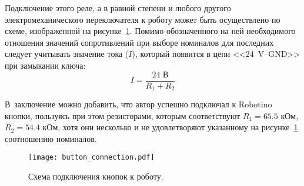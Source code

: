 Подключение этого реле, а в равной степени и любого другого электромеханического переключателя к роботу может быть осуществлено по схеме, изображенной на рисунке~\ref{img_button_connection}.
Помимо обозначенного на ней необходимого отношения значений сопротивлений при выборе номиналов для последних следует учитывать значение тока ($I$), который появится в цепи <<24~V--GND>> при замыкании ключа:
\begin{equation}
    I = \frac{24\text{ В}}{R_1 + R_2}
\end{equation}

В~заключение можно добавить, что автор успешно подключал к Robotino кнопки, пользуясь при этом резисторами, которым соответствуют $R_1 = 65.5\text{ кОм}$, $R_2 = 54.4\text{ кОм}$, хотя они несколько и не удовлетворяют указанному на рисунке~\ref{img_button_connection} соотношению номиналов.

\begin{figure}[h!]
	\centering
	\texttt{[image: button\_connection.pdf]}
	\caption{Схема подключения кнопок к роботу.}
	\label{img_button_connection}
\end{figure}
